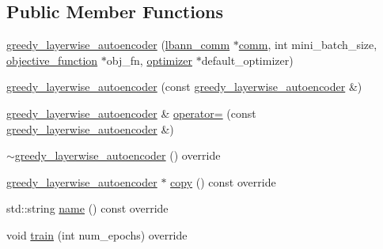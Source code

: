 \subsection*{Public Member Functions}
\begin{DoxyCompactItemize}
\item 
\hyperlink{classlbann_1_1greedy__layerwise__autoencoder_a36dff325c3c756623b28cb056f91e058}{greedy\+\_\+layerwise\+\_\+autoencoder} (\hyperlink{classlbann_1_1lbann__comm}{lbann\+\_\+comm} $\ast$\hyperlink{file__io_8cpp_ab048c6f9fcbcfaa57ce68b00263dbebe}{comm}, int mini\+\_\+batch\+\_\+size, \hyperlink{classlbann_1_1objective__function}{objective\+\_\+function} $\ast$obj\+\_\+fn, \hyperlink{classlbann_1_1optimizer}{optimizer} $\ast$default\+\_\+optimizer)
\item 
\hyperlink{classlbann_1_1greedy__layerwise__autoencoder_adf8750be08e34891701a24678f703acd}{greedy\+\_\+layerwise\+\_\+autoencoder} (const \hyperlink{classlbann_1_1greedy__layerwise__autoencoder}{greedy\+\_\+layerwise\+\_\+autoencoder} \&)
\item 
\hyperlink{classlbann_1_1greedy__layerwise__autoencoder}{greedy\+\_\+layerwise\+\_\+autoencoder} \& \hyperlink{classlbann_1_1greedy__layerwise__autoencoder_ac5e2de693353966b7816ca10282068f5}{operator=} (const \hyperlink{classlbann_1_1greedy__layerwise__autoencoder}{greedy\+\_\+layerwise\+\_\+autoencoder} \&)
\item 
\hyperlink{classlbann_1_1greedy__layerwise__autoencoder_a74aa0b263d78b6a7a8ac32cde6e05c4c}{$\sim$greedy\+\_\+layerwise\+\_\+autoencoder} () override
\item 
\hyperlink{classlbann_1_1greedy__layerwise__autoencoder}{greedy\+\_\+layerwise\+\_\+autoencoder} $\ast$ \hyperlink{classlbann_1_1greedy__layerwise__autoencoder_a435fa0830662ebde904b9e70902f7e16}{copy} () const override
\item 
std\+::string \hyperlink{classlbann_1_1greedy__layerwise__autoencoder_a975ea739b9a97e76fac46ce8191dea84}{name} () const override
\item 
void \hyperlink{classlbann_1_1greedy__layerwise__autoencoder_a085f0b2debb82d9c4927a1c8b11dd353}{train} (int num\+\_\+epochs) override
\end{DoxyCompactItemize}
